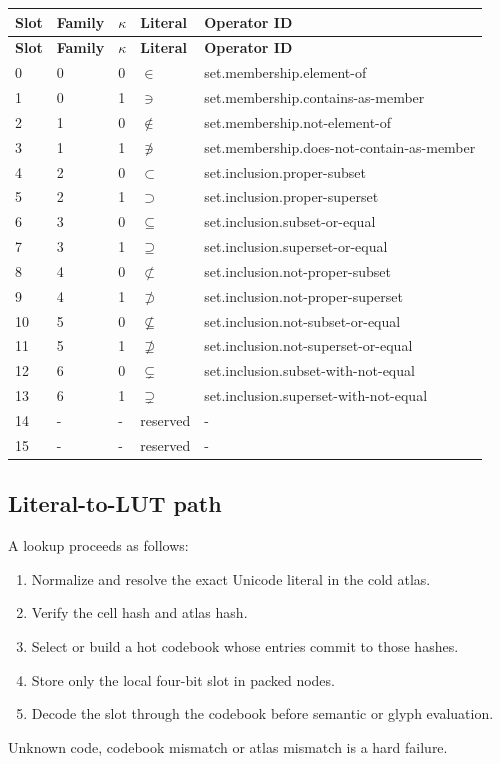 \documentclass[11pt,a4paper]{article}
\begin{document}
\begin{longtable}{P{13mm}P{15mm}P{12mm}P{18mm}P{90mm}}
\toprule
\textbf{Slot} & \textbf{Family} & \textbf{\(\kappa\)} & \textbf{Literal} & \textbf{Operator ID}\\
\midrule
\endfirsthead
\toprule
\textbf{Slot} & \textbf{Family} & \textbf{\(\kappa\)} & \textbf{Literal} & \textbf{Operator ID}\\
\midrule
\endhead
\bottomrule
\endlastfoot
0 & 0 & 0 & \(∈\) & set.membership.element-of \\
1 & 0 & 1 & \(∋\) & set.membership.contains-as-member \\
2 & 1 & 0 & \(∉\) & set.membership.not-element-of \\
3 & 1 & 1 & \(∌\) & set.membership.does-not-contain-as-member \\
4 & 2 & 0 & \(⊂\) & set.inclusion.proper-subset \\
5 & 2 & 1 & \(⊃\) & set.inclusion.proper-superset \\
6 & 3 & 0 & \(⊆\) & set.inclusion.subset-or-equal \\
7 & 3 & 1 & \(⊇\) & set.inclusion.superset-or-equal \\
8 & 4 & 0 & \(⊄\) & set.inclusion.not-proper-subset \\
9 & 4 & 1 & \(⊅\) & set.inclusion.not-proper-superset \\
10 & 5 & 0 & \(⊈\) & set.inclusion.not-subset-or-equal \\
11 & 5 & 1 & \(⊉\) & set.inclusion.not-superset-or-equal \\
12 & 6 & 0 & \(⊊\) & set.inclusion.subset-with-not-equal \\
13 & 6 & 1 & \(⊋\) & set.inclusion.superset-with-not-equal \\
14 & - & - & reserved & - \\
15 & - & - & reserved & - \\
\end{longtable}

\subsection{Literal-to-LUT path}
A lookup proceeds as follows:
\begin{enumerate}
\item Normalize and resolve the exact Unicode literal in the cold atlas.
\item Verify the cell hash and atlas hash.
\item Select or build a hot codebook whose entries commit to those hashes.
\item Store only the local four-bit slot in packed nodes.
\item Decode the slot through the codebook before semantic or glyph evaluation.
\end{enumerate}
Unknown code, codebook mismatch or atlas mismatch is a hard failure.
\end{document}
